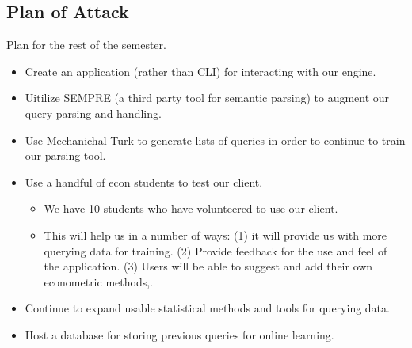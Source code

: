 \documentclass[pageno]{jpaper}
\begin{document}
\subsection{Plan of Attack}
Plan for the rest of the semester.
\begin{itemize}
\item Create an application (rather than CLI) for interacting with our engine.
\item Uitilize SEMPRE (a third party tool for semantic parsing) to augment our query parsing and handling.
\item Use Mechanichal Turk to generate lists of queries in order to continue to train our parsing tool.
\item Use a handful of econ students to test our client.
\begin{itemize}
\item We have 10 students who have volunteered to use our client.
\item This will help us in a number of ways: (1) it will provide us with more querying data for training. (2) Provide feedback for the use and feel of the application. (3) Users will be able to suggest and add their own econometric methods,.

\end{itemize}
\item Continue to expand usable statistical methods and tools for querying data.
\item Host a database for storing previous queries for online learning.
\end{itemize}






\end{document}
